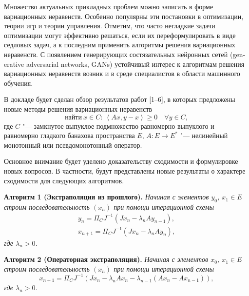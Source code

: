 
\vzmscaption

Множество актуальных  прикладных проблем можно записать в форме вариационных неравенств. Особенно популярны эти постановки в оптимизации, теории игр и теории управления. Отметим, что часто негладкие задачи оптимизации могут эффективно решаться, если
их переформулировать в виде седловых задач, а к последним применить алгоритмы решения вариационных неравенств. С появлением
генерирующих состязательных нейронных сетей
\foreignlanguage{english}{(generative adversarial networks, GANs)}
устойчивый интерес к алгоритмам решения вариационных неравенств возник и в среде специалистов в области машинного обучения.

В докладе будет сделан обзор результатов работ [1--6], в которых предложены новые методы решения вариационных неравенств
$$
\mbox{найти} \  x \in C :  \ \left\langle Ax, y-x \right\rangle \geq 0\quad \forall y \in C,
$$
где $C$ "--- замкнутое выпуклое подмножество равномерно выпуклого и равномерно гладкого банахова пространства $E$, $A: E \to E^\ast$ "--- нелинейный монотонный или псевдомонотонный оператор.

Основное внимание будет уделено доказательству сходимости и
формулировке новых вопросов. В частности, будут представлены новые результаты о характере сходимости для следующих алгоритмов.

	\textbf{Алгоритм 1 (Экстраполяция из прошлого).} {\it Начиная с элементов $y_0$, $x_1 \in E$ строим последовательность $(x_n)$ при помощи итерационной схемы
$$
\begin{array}{l}
y_{n}  = \Pi _{C} J^{-1} \left( Jx_{n} -\lambda_n Ay_{n-1} \right), \\
x_{n+1} = \Pi _{C} J^{-1} \left( Jx_{n} -\lambda_n Ay_{n} \right),
\end{array}
$$
где $\lambda_n >0$.}


\textbf{Алгоритм 2 (Операторная экстраполяция).} {\it Начиная с элементов $x_0$, $x_1 \in E$ строим последовательность $(x_n)$ при помощи итерационной схемы
$$
x_{n+1} =\Pi _{C} J^{-1} \left(Jx_{n} -\lambda _{n} Ax_{n} -\lambda _{n-1} \left(Ax_{n} -Ax_{n-1} \right)\right) ,
$$
где $\lambda_n >0$.}


